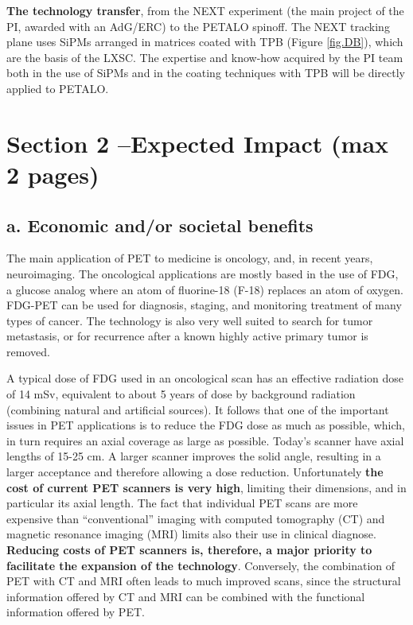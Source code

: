 \documentclass[11pt,a4paper]{article}
\begin{document}
{\bf The technology transfer}, from the NEXT experiment (the main project of the PI, awarded with an AdG/ERC) to the PETALO spinoff. The NEXT tracking plane uses SiPMs arranged in matrices coated with TPB (Figure \ref{fig.DB}), which are the basis of the LXSC. The expertise and know-how acquired by the PI team both in the use of SiPMs and in the coating techniques with TPB will be directly applied to PETALO.

\newpage
\section*{\bf \textsf{Section 2 --Expected Impact (max 2 pages)}}

\subsection*{a. Economic and/or societal benefits}

The main application of PET to medicine is oncology, and, in recent years, neuroimaging. The oncological applications are mostly based in the use of FDG, a glucose analog where an atom of fluorine-18 (F-18) replaces an atom of oxygen. FDG-PET can be used for diagnosis, staging, and monitoring treatment of many types of cancer. The technology is also very well suited to search for tumor metastasis, or for recurrence after a known highly active primary tumor is removed. 

A typical dose of FDG used in an oncological scan has an effective radiation dose of 14 mSv, equivalent to about 5 years of dose by background radiation (combining natural and artificial sources). It follows that one of the important issues in PET applications is to reduce the FDG dose as much as possible, which, in turn requires an axial coverage as large as possible. Today's scanner have axial lengths of 15-25 cm. A larger scanner improves the solid angle, resulting in a larger acceptance and therefore allowing a dose reduction. Unfortunately {\bf the cost of current PET scanners is very high}, limiting their dimensions, and in particular its axial length. The fact that  individual PET scans are more expensive than ``conventional'' imaging with computed tomography (CT) and magnetic resonance imaging (MRI) limits also their use in clinical diagnose. {\bf Reducing costs of PET scanners is, therefore, a major priority to facilitate the expansion of the technology}. Conversely, the combination of PET with CT and MRI often leads to much improved scans, since the structural information offered by CT and MRI can be combined with the functional information offered by PET. 
\end{document}
